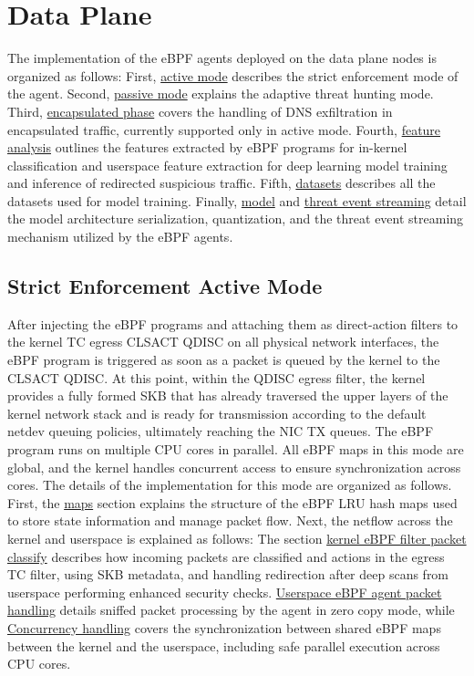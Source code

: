 \documentclass [11pt, proquest] {uwthesis}[2020/02/24]
\begin{document}
\section{Data Plane}
The implementation of the eBPF agents deployed on the data plane nodes is organized as follows: First, \hyperref[sec:active]{active mode} describes the strict enforcement mode of the agent. Second, \hyperref[sec:passive]{passive mode} explains the adaptive threat hunting mode. Third, \hyperref[sec:encap]{encapsulated phase} covers the handling of DNS exfiltration in encapsulated traffic, currently supported only in active mode. Fourth, \hyperref[sec:features]{feature analysis} outlines the features extracted by eBPF programs for in-kernel classification and userspace feature extraction for deep learning model training and inference of redirected suspicious traffic. Fifth, \hyperref[sec:dataset]{datasets} describes all the datasets used for model training. Finally, \hyperref[sec:model]{model} and \hyperref[sec:threat-event-streaming]{threat event streaming} detail the model architecture serialization, quantization, and the threat event streaming mechanism utilized by the eBPF agents.

\subsection{Strict Enforcement Active Mode}
\label{sec:active}
After injecting the eBPF programs and attaching them as direct-action filters to the kernel TC egress CLSACT QDISC on all physical network interfaces, the eBPF program is triggered as soon as a packet is queued by the kernel to the CLSACT QDISC. At this point, within the QDISC egress filter, the kernel provides a fully formed SKB that has already traversed the upper layers of the kernel network stack and is ready for transmission according to the default netdev queuing policies, ultimately reaching the NIC TX queues. The eBPF program runs on multiple CPU cores in parallel. All eBPF maps in this mode are global, and the kernel handles concurrent access to ensure synchronization across cores. The details of the implementation for this mode are organized as follows. First, the \hyperref[sec:dp_eBPF_LRU_Maps_active]{maps} section explains the structure of the eBPF LRU hash maps used to store state information and manage packet flow. Next, the netflow across the kernel and userspace is explained as follows:
The section \hyperref[active:sec1]{kernel eBPF filter packet classify} describes how incoming packets are classified and actions in the egress TC filter, using SKB metadata, and handling redirection after deep scans from userspace performing enhanced security checks. \hyperref[active:sec3]{Userspace eBPF agent packet handling} details sniffed packet processing by the agent in zero copy mode, while \hyperref[active:sec3]{Concurrency handling} covers the synchronization between shared eBPF maps between the kernel and the userspace, including safe parallel execution across CPU cores.
\end{document}
